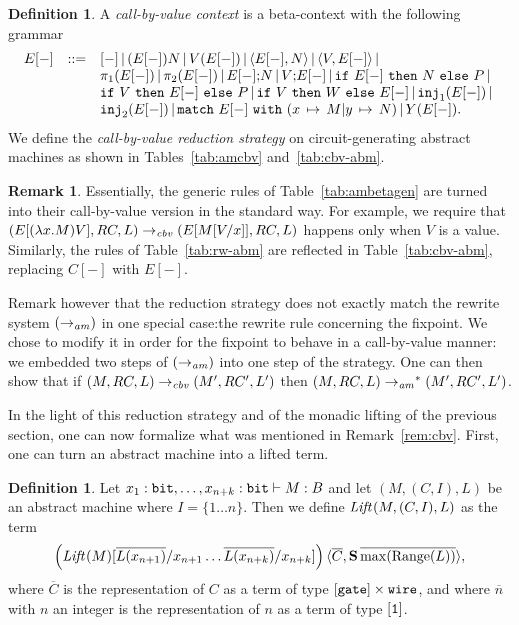 \documentclass{article}
\theoremstyle{plain}
\theoremstyle{definition}
\newtheorem{definition}[theorem]{Definition}
\newtheorem{remark}[theorem]{Remark}
\newcommand{\bit}{{\tt bit}}
\newcommand{\define}[1]{{\em #1}}
\newcommand{\bor}{\,{|}\,}
\newcommand{\listtype}[1]{{[}{#1}{]}}
\newcommand{\unittype}{{\tt 1}}
\newcommand{\letunitterm}[2]{{#1}\mathtt{;}{#2}}
\newcommand{\iftermx}[3]{{{\mathtt{if}}~{#1}~\mathtt{then}~{#2}~\mathtt{else}~{#3}}}
\newcommand{\inj}{{\tt inj}}
\newcommand{\match}[5]{{{\mathtt{match}}~{#1}~{\mathtt{with}}~({#2\,\mapsto\,#3}\vert{#4\,\mapsto\,#5})}}
\newcommand{\rwam}{\mathrel{\to_{\it am}}}
\newcommand{\cbvam}{\mathrel{\to_{\it cbv}}}
\newcommand{\Lift}[1]{{\it Lift}_{\mathcal{#1}}}
\newcommand{\wiretype}{{\tt wire}}
\newcommand{\gatetype}{{\tt gate}}
\newcommand{\succterm}{{\bf S}}
\begin{document}
\begin{definition}
A \define{call-by-value context} is a beta-context with the following
grammar
\[
\begin{array}{lll}
E[-]
&{:}{:}{=}&
[-]
\bor
(E[-])N \bor V(E[-]) \bor
\prodterm{E[-],N} \bor
\prodterm{V,E[-]} \bor
\\
&&
\pi_1(E[-]) \bor
\pi_2(E[-]) \bor
\letunitterm{E[-]}{N} \bor
\letunitterm{V}{E[-]} \bor
\iftermx{E[-]}{N}{P} \bor
\\
&&
\iftermx{V}{E[-]}{P} \bor
\iftermx{V}{W}{E[-]} \bor
\inj_1(E[-]) \bor 
\\
&&
\inj_2(E[-]) \bor
\match{E[-]}{x}{M}{y}{N} \bor
Y(E[-]).
\end{array}
\]
We define the \define{call-by-value reduction strategy} on
circuit-generating abstract machines as shown in Tables~\ref{tab:amcbv}
and~\ref{tab:cbv-abm}.
\end{definition}

\begin{remark}
  Essentially, the generic rules of Table~\ref{tab:ambetagen} are
  turned into their call-by-value version in the standard way.  For
  example, we require that
  $(E[(\lambda x.M)V], RC, L) \cbvam (E[M{[}V/x{]}], RC, L)$ happens
  only when $V$ is a value. Similarly, the rules of
  Table~\ref{tab:rw-abm} are reflected in Table~\ref{tab:cbv-abm},
  replacing $C[-]$ with $E[-]$.

  Remark however that the reduction strategy does not exactly match
  the rewrite system $(\rwam)$ in one special case:the rewrite rule
  concerning the fixpoint. We chose to modify it in order for the
  fixpoint to behave in a call-by-value manner: we embedded two steps
  of $(\rwam)$ into one step of the strategy.
One can then show that if $(M,RC,L)\cbvam(M',RC',L')$
  then $(M,RC,L)\rwam^*(M',RC',L')$.
\end{remark}



In the light of this reduction strategy and of the monadic lifting of
the previous section, one can now formalize what was mentioned in
Remark~\ref{rem:cbv}. 
First, one can turn an abstract machine into a lifted term.

\begin{definition}\label{def:amlift}
  Let $x_1:\bit,\ldots,x_{n+k}:\bit\vdash M:B$ and let $(M,(C,I),L)$
  be an abstract machine where $I=\{1\ldots n\}$. Then we define
  $\Lift{}(M,(C,I),L)$ as the term\vspace{-2ex}
  \[\vspace{-2ex}
    \left(\Lift{}(M)[\overline{L(x_{n+1})}/x_{n+1}\ldots
    \overline{L(x_{n+k})}/x_{n+k}]\right)
    \prodterm{\overline{C},\succterm\,\overline{\max({\rm
        Range}(L))}},
  \]
  where $\overline{C}$ is the representation of $C$ as a term of type
  $\listtype{\gatetype}\times\wiretype$, and where $\overline{n}$ with
  $n$ an integer is the representation of $n$ as a term of type
  $\listtype{\unittype}$.
\end{definition}
\end{document}
